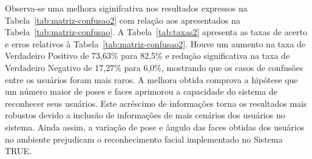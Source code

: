 	Observa-se uma melhora siginifcativa nos resultados expressos na Tabela~\ref{tab:matriz-confusao2} com relação aos apresentados na Tabela~\ref{tab:matriz-confusao}. A Tabela~\ref{tab:taxas2} apresenta as taxas de acerto e erros relativos à Tabela~\ref{tab:matriz-confusao2}. Houve um aumento na taxa de Verdadeiro Positivo de 73,63\% para 82,5\% e redução significativa na taxa de Verdadeiro Negativo de 17,27\% para 6,0\%, mostrando que os casos de confusões entre os usuários foram mais raros. A melhora obtida comprova a hipótese que um número maior de poses e faces aprimorou a capacidade do sistema de reconhecer seus usuários. Este acréscimo de informações torna os resultados mais robustos devido a inclusão de informações de mais cenários dos usuários no sistema. Ainda assim, a variação de pose e ângulo das faces obtidas dos usuários no ambiente prejudicam o reconhecimento facial implementado no Sistema TRUE.




